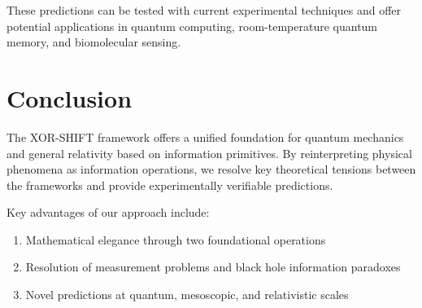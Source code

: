 \documentclass[aps,prl,preprint,superscriptaddress,showpacs]{revtex4-2}
\begin{document}
These predictions can be tested with current experimental techniques and offer potential applications in quantum computing, room-temperature quantum memory, and biomolecular sensing.

\section{Conclusion}

The XOR-SHIFT framework offers a unified foundation for quantum mechanics and general relativity based on information primitives. By reinterpreting physical phenomena as information operations, we resolve key theoretical tensions between the frameworks and provide experimentally verifiable predictions.

Key advantages of our approach include:

\begin{enumerate}
\item Mathematical elegance through two foundational operations
\item Resolution of measurement problems and black hole information paradoxes
\item Novel predictions at quantum, mesoscopic, and relativistic scales
\end{enumerate}
\end{document}
